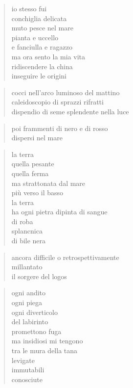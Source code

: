 	\begin{verse}
		io stesso fui\\
		conchiglia delicata\\
		muto pesce nel mare\\
		pianta e uccello\\
		e fanciulla e ragazzo\\
		ma ora sento la mia vita\\
		ridiscendere la china\\
		inseguire le origini
	\end{verse}

\clearpage



	\begin{verse}
		cocci nell’arco luminoso del mattino\\
		caleidoscopio di sprazzi rifratti\\
		dispendio di seme splendente nella luce
	\end{verse}

	\begin{verse}
		poi frammenti di nero e di rosso\\
		dispersi nel mare
	\end{verse}

	\begin{verse}
		la terra\\
		quella pesante\\
		quella ferma\\
		ma strattonata dal mare\\
		più verso il basso\\
		la terra\\
		ha ogni pietra dipinta di sangue\\
		di roba\\
		splancnica\\
		di bile nera
	\end{verse}

	\begin{verse}
		ancora difficile o retrospettivamente\\
		millantato\\
		il sorgere del logos
	\end{verse}

\clearpage



	\begin{verse}
		ogni andito\\
		ogni piega\\
		ogni diverticolo\\
		del labirinto\\
		promettono fuga\\
		ma insidiosi mi tengono\\
		tra le mura della tana\\
		levigate\\
		immutabili\\
		conosciute
	\end{verse}

